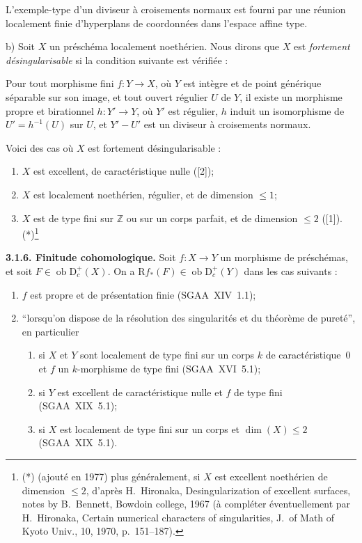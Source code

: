 \documentclass[11pt]{article}
\newcommand{\R}{\mathrm{R}}\newcommand{\RHomCore}{\mathrm{RHom}}
\newcommand{\D}{\mathrm{D}}
\newcommand{\Z}{\mathbb{Z}}
\newcommand{\ob}{\operatorname{ob}}
\providecommand{\ob}{\operatorname{ob}}
\providecommand{\R}{\mathrm R}
\providecommand{\Z}{\mathbb Z}
\begin{document}
L'exemple-type d'un diviseur à croisements normaux est fourni par une réunion localement finie d'hyperplans de coordonnées dans l'espace affine type.

b) Soit $X$ un préschéma localement noethérien. Nous dirons que $X$ est \emph{fortement désingularisable} si la condition suivante est vérifiée :

Pour tout morphisme fini $f : Y \to X$, où $Y$ est intègre et de point générique séparable sur son image, et tout ouvert régulier $U$ de $Y$, il existe un morphisme propre et birationnel $h : Y' \to Y$, où $Y'$ est régulier, $h$ induit un isomorphisme de $U' = h^{-1}(U)$ sur $U$, et $Y' - U'$ est un diviseur à croisements normaux.

Voici des cas où $X$ est fortement désingularisable :
\begin{enumerate}
\item[a)] $X$ est excellent, de caractéristique nulle ([2]);
\item[b)] $X$ est localement noethérien, régulier, et de dimension $\leqslant 1$;
\item[c)] $X$ est de type fini sur $\Z$ ou sur un corps parfait, et de dimension $\leqslant 2$ ([1]).(*)\footnote{(*) (ajouté en 1977) plus généralement, si $X$ est excellent noethérien de dimension $\leqslant 2$, d'après H.~Hironaka, Desingularization of excellent surfaces, notes by B.~Bennett, Bowdoin college, 1967 (à compléter éventuellement par H.~Hironaka, Certain numerical characters of singularities, J.~of Math of Kyoto Univ., 10, 1970, p.~151--187).}
\end{enumerate}

\textbf{3.1.6. Finitude cohomologique.} Soit $f : X \to Y$ un morphisme de préschémas, et soit $F \in \ob \D_c^{+}(X)$. On a $\R f_{*}(F) \in \ob \D_c^{+}(Y)$ dans les cas suivants :
\begin{enumerate}
\item[a)] $f$ est propre et de présentation finie (SGAA~XIV~1.1);
\item[b)] ``lorsqu'on dispose de la résolution des singularités et du théorème de pureté'', en particulier
\begin{enumerate}
\item[(i)] si $X$ et $Y$ sont localement de type fini sur un corps $k$ de caractéristique~0 et $f$ un $k$-morphisme de type fini (SGAA~XVI~5.1);
\item[(ii)] si $Y$ est excellent de caractéristique nulle et $f$ de type fini (SGAA~XIX~5.1);
\item[(iii)] si $X$ est localement de type fini sur un corps et $\dim(X) \leqslant 2$ (SGAA~XIX~5.1).
\end{enumerate}
\end{enumerate}
\end{document}
